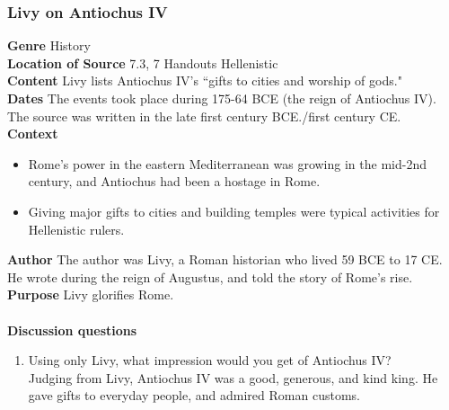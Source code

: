 \documentclass{article}
\begin{document}
\subsubsection*{Livy on Antiochus IV}
\textbf{Genre}
History \\
\textbf{Location of Source}
7.3, 7 Handouts Hellenistic \\
\textbf{Content}
Livy lists Antiochus IV’s “gifts to cities and worship of gods." \\
\textbf{Dates}
The events took place during 175-64 BCE (the reign of Antiochus IV).  The source was
written in the late first century BCE./first century CE. \\
\textbf{Context}
\begin{itemize}
  \item Rome’s power in the eastern Mediterranean was growing in the mid-2nd century,
  and Antiochus had been a hostage in Rome.
  \item Giving major gifts to cities and building temples were typical activities for
  Hellenistic rulers.
\end{itemize}
\textbf{Author}
The author was Livy,  a Roman historian who lived 59 BCE to 17 CE. He wrote during the
reign of Augustus, and told the story of Rome’s rise. \\
\textbf{Purpose}
Livy glorifies Rome. \\
\\
\textbf{Discussion questions}
\begin{enumerate}
  \item Using only Livy, what impression would you get of Antiochus IV? \\
  Judging from Livy, Antiochus IV was a good, generous, and kind king. He gave gifts to
  everyday people, and admired Roman customs.
\end{enumerate}
\end{document}
